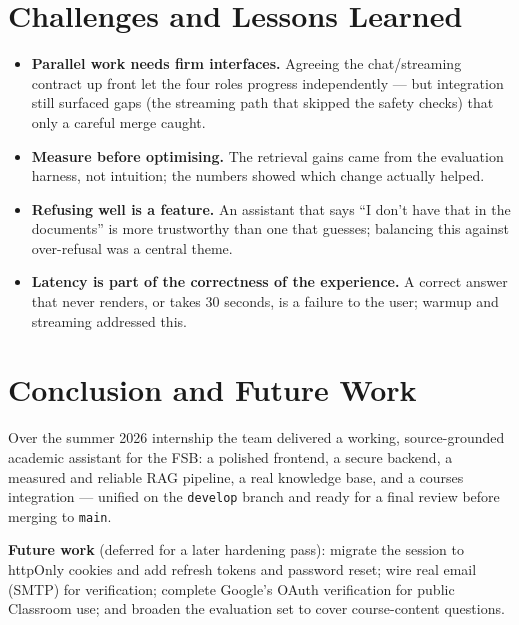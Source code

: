 \documentclass[11pt,a4paper]{article}
\begin{document}
\section{Challenges and Lessons Learned}
\begin{itemize}
\item \textbf{Parallel work needs firm interfaces.} Agreeing the chat/streaming contract up front let the four roles progress independently --- but integration still surfaced gaps (the streaming path that skipped the safety checks) that only a careful merge caught.
\item \textbf{Measure before optimising.} The retrieval gains came from the evaluation harness, not intuition; the numbers showed which change actually helped.
\item \textbf{Refusing well is a feature.} An assistant that says ``I don't have that in the documents'' is more trustworthy than one that guesses; balancing this against over-refusal was a central theme.
\item \textbf{Latency is part of the correctness of the experience.} A correct answer that never renders, or takes 30 seconds, is a failure to the user; warmup and streaming addressed this.
\end{itemize}

\section{Conclusion and Future Work}
Over the summer 2026 internship the team delivered a working, source-grounded academic assistant for the FSB: a polished frontend, a secure backend, a measured and reliable RAG pipeline, a real knowledge base, and a courses integration --- unified on the \texttt{develop} branch and ready for a final review before merging to \texttt{main}.

\textbf{Future work} (deferred for a later hardening pass): migrate the session to httpOnly cookies and add refresh tokens and password reset; wire real email (SMTP) for verification; complete Google's OAuth verification for public Classroom use; and broaden the evaluation set to cover course-content questions.

\appendix
\end{document}
